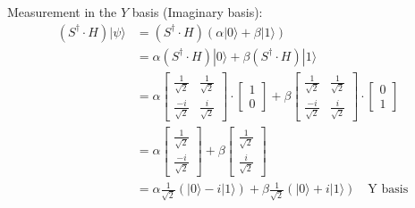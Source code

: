 \documentclass{article}
\begin{document}
Measurement in the $Y$ basis (Imaginary basis):
\begin{align*}
	(S^\dagger \cdot H) |\psi\rangle & = (S^\dagger \cdot H)(\alpha |0\rangle + \beta |1\rangle)                                                                  \\
	                                 & = \alpha (S^\dagger \cdot H)|0\rangle + \beta (S^\dagger \cdot H)|1\rangle                                                 \\
	                                 & = \alpha \begin{bmatrix}
		                                            \frac{1}{\sqrt{2}}  & \frac{1}{\sqrt{2}} \\
		                                            \frac{-i}{\sqrt{2}} & \frac{i}{\sqrt{2}}
	                                            \end{bmatrix}
	\cdot
	\begin{bmatrix}
		1 \\
		0
	\end{bmatrix}
	+ \beta \begin{bmatrix}
		        \frac{1}{\sqrt{2}}  & \frac{1}{\sqrt{2}} \\
		        \frac{-i}{\sqrt{2}} & \frac{i}{\sqrt{2}}
	        \end{bmatrix}
	\cdot
	\begin{bmatrix}
		0 \\
		1
	\end{bmatrix}                                                                                                                                                \\
	                                 & =
	\alpha \begin{bmatrix}
		       \frac{1}{\sqrt{2}} \\
		       \frac{-i}{\sqrt{2}}
	       \end{bmatrix}
	+
	\beta \begin{bmatrix}
		      \frac{1}{\sqrt{2}} \\
		      \frac{i}{\sqrt{2}}
	      \end{bmatrix}                                                                                                                       \\
	                                 & = \alpha \frac{1}{\sqrt{2}}(|0\rangle - i|1\rangle) + \beta \frac{1}{\sqrt{2}}(|0\rangle + i|1\rangle)\quad \text{Y basis}
\end{align*}
\end{document}
